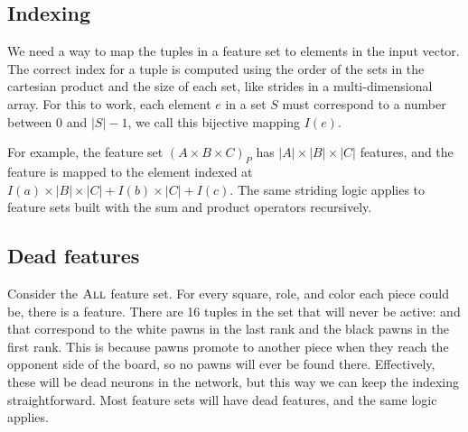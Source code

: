 \newpage
\subsection{Indexing}


We need a way to map the tuples in a feature set to elements in the input vector. The correct index for a tuple is computed using the order of the sets in the cartesian product and the size of each set, like strides in a multi-dimensional array. For this to work, each element $e$ in a set $S$ must correspond to a number between $0$ and $|S| - 1$, we call this bijective mapping $I(e)$.

For example, the feature set $(A \times B \times C)_{P}$ has $|A| \times |B| \times |C|$ features, and the feature  is mapped to the element indexed at $I(a) \times |B| \times |C| + I(b) \times |C| + I(c)$. The same striding logic applies to feature sets built with the sum and product operators recursively.

\subsection{Dead features}

Consider the $\textsc{All}$ feature set. For every square, role, and color each piece could be, there is a feature. There are 16 tuples in the set that will never be active:  and  that correspond to the white pawns in the last rank and the black pawns in the first rank. This is because pawns promote to another piece when they reach the opponent side of the board, so no pawns will ever be found there. Effectively, these will be dead neurons in the network, but this way we can keep the indexing straightforward. Most feature sets will have dead features, and the same logic applies.

